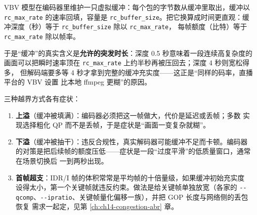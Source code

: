 \documentclass[12pt,a4paper,fontset=fandol]{ctexbook}
\newcommand{\Tp}[1]{\texttt{#1}}
\newcommand{\Opt}[1]{\texttt{-\/-#1}}
\begin{document}
VBV 模型在编码器里维护一只虚拟缓冲：每个包的字节数从缓冲里取出，缓冲以
\Tp{rc\_max\_rate} 的速率回填，容量是 \Tp{rc\_buffer\_size}。把它换算成时间更直观：缓冲深度（秒）等于 \Tp{rc\_buffer\_size} 除以 \Tp{rc\_max\_rate}，
每帧额度（比特）等于 \Tp{rc\_max\_rate} 除以帧率。

于是``缓冲''的真实含义是\textbf{允许的突发时长}：深度 0.5 秒意味着一段连续高复杂度的
画面可以把瞬时速率顶在 \Tp{rc\_max\_rate} 上约半秒再被压回去；深度 4 秒则宽松得多，
但解码端要多等 4 秒才拿到完整的缓冲充实度——这正是``同样的码率，直播平台的 VBV 设置
比本地 ffmpeg 更糊''的原因。

三种越界方式各有症状：

\begin{enumerate}
\item \textbf{上溢}（缓冲被填满）：编码器必须把这一帧做大，代价是延迟或丢帧；多数
  实现选择粗化 QP 而不是丢帧，于是症状是``画面一变复杂就糊''。
\item \textbf{下溢}（缓冲被抽干）：违反合规性，真实解码器可能缓冲不足而卡顿。编码器
  的对策是把后续帧的额度压低——症状是一段``过度平滑''的低质量窗口，通常在场景切换后
  一到两秒出现。
\item \textbf{首帧超支}：IDR/I 帧的体积常常是平均帧的十倍量级，如果缓冲初始充实度
  设得太小，第一个关键帧就违反约束。做法是给关键帧单独放宽（各家的
  \Opt{qcomp}、\Opt{ipratio}、关键帧量化偏移一族），并把 GOP 长度与网络侧的丢包恢复
  需求一起定，见第 \ref{ch:ch14-congestion-abr} 章。
\end{enumerate}
\end{document}
